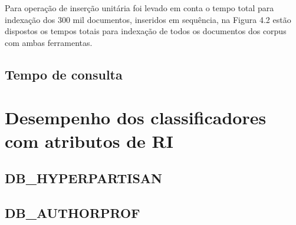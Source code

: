 			

			Para operação de inserção unitária foi levado em conta o tempo total para indexação dos 300 mil documentos, inseridos em sequência, na Figura 4.2 estão dispostos os tempos totais para indexação de todos os documentos dos corpus com ambas ferramentas. 

		\subsection{Tempo de consulta}

	\section{Desempenho dos classificadores com atributos de RI} \label{sec:resex1}

		\subsection{DB\_HYPERPARTISAN}

		\subsection{DB\_AUTHORPROF}






